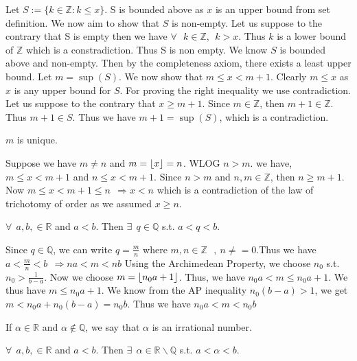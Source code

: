 \documentclass{scrartcl}
\begin{document}
    \begin{proof*}
        Let $S:=\{k \in \mathbb{Z} : k \leq x\}$. 
        S is bounded above as $x$ is an upper bound from set definition. We now aim to show that $S$ is non-empty.
        Let us suppose to the contrary that S is empty then we have 
        $\forall ~~~ k\in \mathbb{Z}, ~~ k>x$.  
        Thus $k$ is a lower bound of $\mathbb{Z}$ which is a constradiction. Thus S is non empty.
        We know $S$ is bounded above and non-empty. Then by the completeness axiom, there exists a least upper bound.
        Let $m = \sup(S)$. We now show that $m\leq x < m+1$. Clearly $m \leq x$ as $x$ is any upper bound for $S$. For proving the right inequality we use contradiction. 
        Let us suppose to the contrary that $x\geq m+1$. Since $m\in \mathbb{Z}$, then $m+1\in \mathbb{Z}$. Thus $m+1\in S$. Thus we have $m+1 = \sup(S)$, which is a contradiction.
    \end{proof*}
    \begin{claim*}
        $m$ is unique. 
        \begin{proof*}
            Suppose we have $m \neq n$ and $m = \left\lfloor x \right\rfloor=n$.
            WLOG $n>m$. 
            we have,$m \leq x < m+1 $ and $n\leq x < m+1$.
            Since $n>m$ and $n,m \in \mathbb{Z}$, then $n \geq m+1$.  
            Now $m \leq x <m+1 \leq n ~~\Rightarrow x<n$   
            which is a contradiction of the law of trichotomy of order as we assumed $x\geq n$. 
        \end{proof*}
    \end{claim*}
    \begin{theorem}
        $\forall ~~ a,b,\in \mathbb{R}$ and $a<b$. Then $\exists ~~q\in \mathbb{Q}$ s.t. $a<q<b$.
    \end{theorem}
    \begin{proof*}
        Since $q \in \mathbb{Q}$, we can write $q = \frac{m}{n}$ where $m,n\in\mathbb{Z}~~~,~n\neq=0$.Thus we have $a<\frac{m}{n}<b~~ \Rightarrow na<m<nb$
        Using the Archimedean Property, we choose $n_0$ s.t. $n_0 > \frac{1}{b-a}$. Now we choose $m = \left\lfloor n_0a+1 \right\rfloor$. Thus, we have $n_0a<m\leq n_0a+1$. We thus have
        $m\leq n_0a+1 $. We know from the AP inequality $n_0(b-a)>1$, we get $m < n_0a+n_0(b-a) =n_0b $. Thus we have $n_0a<m<n_0b$
    \end{proof*}
    \begin{definition}
        If $\alpha \in \mathbb{R}$ and $\alpha \notin \mathbb{Q}$, we say that $\alpha$ is an irrational number.
    \end{definition}
    \begin{theorem}
        $\forall ~~ a,b,\in \mathbb{R}$ and $a<b$. Then $\exists ~~\alpha\in \mathbb{R}\backslash\mathbb{Q}$ s.t. $a<\alpha<b$.
    \end{theorem}
\end{document}
